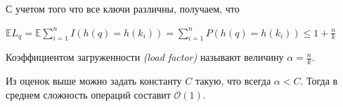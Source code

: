 С учетом того что все ключи различны, получаем, что

\begin{center}
{\large $\mathbb{E} L_q = \mathbb{E} \sum\limits_{i = 1}^{n} I(h(q) = h(k_i)) = \sum\limits_{i = 1}^{n} P(h(q) = h(k_i)) \leq 1 + \frac{n}{k}$}
\end{center}

\Def Коэффициентом загруженности \textit{(load factor)} называют величину $\alpha = \frac{n}{k}$.

\Note Из оценок выше можно задать константу $C$ такую, что всегда $\alpha < C$. Тогда в среднем сложность операций составит $\mathcal{O}(1)$.

\pagebreak